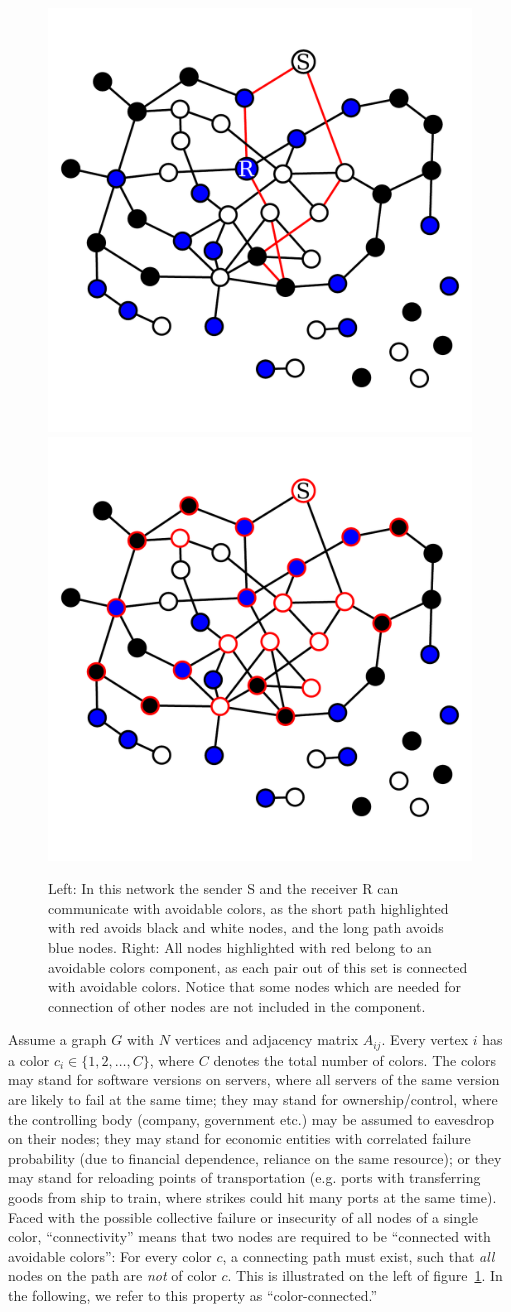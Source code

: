 \documentclass[aps, pre, twocolumn, a4paper, superscriptaddress, floatfix]{revtex4}
\begin{document}
\begin{figure}[htb]
\begin{center}
    \includegraphics[width=0.49\columnwidth]{graph_sr.pdf}
    \includegraphics[width=0.49\columnwidth]{graph_Gcolor.pdf}
    \caption{Left: In this network the sender S and the receiver R can communicate 
    with avoidable colors, as the short path highlighted with red avoids black and 
    white nodes, and the long path avoids blue nodes. Right: All nodes highlighted 
    with red belong to an avoidable colors component, as each pair out of this set 
    is connected with avoidable colors. Notice that some nodes which are needed 
    for connection of other nodes are not included in the component.}
    \label{fig:avoidable_colors}
\end{center}
\end{figure}
%
Assume a graph $G$ with $N$ vertices and adjacency matrix $A_{ij}$. Every vertex 
$i$ has a color $c_i\in\{1,2,\dots,C\}$, where $C$ denotes the total number of colors. 
The colors may stand for software versions on servers, where all servers of the 
same version are likely to fail at the same time; 
they may stand for ownership/control, where the controlling body (company, government etc.) may be assumed to eavesdrop on their nodes;
they may stand for economic entities with correlated failure probability (due to financial dependence, reliance on the same resource); 
or they may stand for reloading points of transportation (e.g. ports with transferring goods from ship to train, where strikes could hit many ports at the same time). 
Faced with the possible collective failure or insecurity of all nodes of a single color, 
``connectivity'' means that two nodes are required to be ``connected with avoidable colors'': 
For every color $c$, a connecting path must exist, such that \textit{all} nodes 
on the path are \textit{not} of color $c$. This is illustrated on the left of 
figure~\ref{fig:avoidable_colors}. 
In the following, we refer to this property as ``color-connected.''
\end{document}
